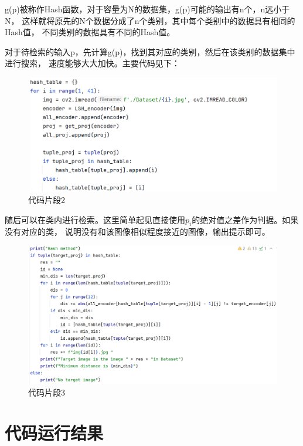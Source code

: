 \documentclass{article}
\begin{document}
\newpage

    g(p)被称作Hash函数，对于容量为N的数据集，g(p)可能的输出有n个，n远小于N，
    这样就将原先的N个数据分成了n个类别，其中每个类别中的数据具有相同的Hash值，
    不同类别的数据具有不同的Hash值。

    对于待检索的输入p，先计算g(p)，找到其对应的类别，然后在该类别的数据集中进行搜索，
    速度能够大大加快。主要代码见下：

\begin{figure}[h]
\centering
\includegraphics[width=1\textwidth]{./prog_part/2}
\caption{代码片段2}
\end{figure}

    随后可以在类内进行检索。这里简单起见直接使用\(p_i\)的绝对值之差作为判据。如果没有对应的类，
    说明没有和该图像相似程度接近的图像，输出提示即可。

\begin{figure}[h]
\centering
\includegraphics[width=1\textwidth]{./prog_part/3}
\caption{代码片段3}
\end{figure}

\section{代码运行结果}
\end{document}
